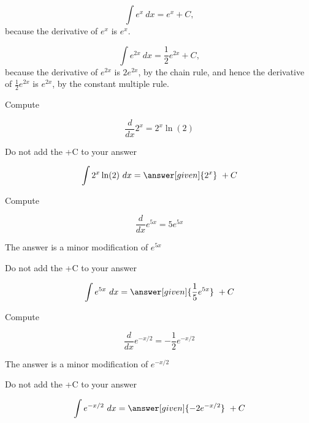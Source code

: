 \documentclass{ximera}
\begin{document}
\begin{example} %
\[
\int e^x \ dx = e^x + C,
\]
because the derivative of $e^x$ is $e^x$.

\end{example}

\begin{example} %
\[
\int e^{2x} \ dx = \frac12 e^{2x} + C,
\]
because the derivative of $e^{2x}$ is $2e^{2x}$, by the chain rule,
and hence the derivative of $\frac12 e^{2x}$ is $e^{2x}$, by the constant multiple rule.

\end{example}

\begin{problem} %
Compute 

\begin{hint}
\[
\frac{d}{dx} 2^x = 2^x \ln(2)
\]
\end{hint}
\begin{hint}
\begin{center}
Do not add the +C to your answer
\end{center}
\end{hint}

\[
\int 2^x \ln(2) \ dx =
\answer[given]{2^x} \ + C
\]
\end{problem}

\begin{problem} %
Compute 

\begin{hint}
\[
\frac{d}{dx} e^{5x} = 5e^{5x}
\]
\end{hint}
\begin{hint}
The answer is a minor modification of $e^{5x}$
\end{hint}
\begin{hint}
\begin{center}
Do not add the +C to your answer
\end{center}
\end{hint}

\[
\int e^{5x} \ dx =
\answer[given]{\frac15 e^{5x}} \ + C
\]
\end{problem}

\begin{problem} %
Compute 

\begin{hint}
\[
\frac{d}{dx} e^{-x/2} = -\frac12 e^{-x/2}
\]
\end{hint}
\begin{hint}
The answer is a minor modification of $e^{-x/2}$
\end{hint}
\begin{hint}
\begin{center}
Do not add the +C to your answer
\end{center}
\end{hint}

\[
\int e^{-x/2} \ dx =
\answer[given]{-2 e^{-x/2}} \ + C
\]
\end{problem}
\end{document}
